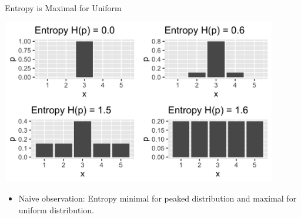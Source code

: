 \documentclass[11pt,compress,t,notes=noshow, xcolor=table]{beamer}
\begin{document}
\begin{vbframe}{Entropy is Maximal for Uniform}

\begin{center}
\includegraphics[width = 0.9\textwidth]{figure/max_entropy.png}
\end{center}

\begin{itemize}
   \item Naive observation: Entropy minimal for peaked distribution and maximal for uniform distribution.
\end{itemize}

\end{vbframe}
\end{document}
